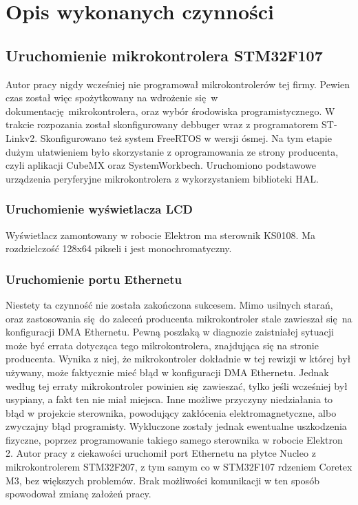 \documentclass[10pt,a4paper]{article}
\begin{document}
	\section{Opis wykonanych czynności}
	\subsection{Uruchomienie mikrokontrolera STM32F107}
	Autor pracy nigdy wcześniej nie programował mikrokontrolerów tej firmy. Pewien czas został więc spożytkowany na wdrożenie się w dokumentację mikrokontrolera, oraz wybór środowiska programistycznego. W trakcie rozpozania został skonfigurowany debbuger wraz z programatorem ST-Linkv2. Skonfigurowano też system FreeRTOS w wersji ósmej. Na tym etapie dużym ułatwieniem było skorzystanie z oprogramowania ze strony producenta, czyli aplikacji CubeMX oraz SystemWorkbech. Uruchomiono podstawowe urządzenia peryferyjne mikrokontrolera z wykorzystaniem biblioteki HAL.
	\subsubsection{Uruchomienie wyświetlacza LCD}
	Wyświetlacz zamontowany w robocie Elektron ma sterownik KS0108. Ma rozdzielczość 128x64 pikseli i jest monochromatyczny.
	\subsubsection{Uruchomienie portu Ethernetu}
	Niestety ta czynność nie została zakończona sukcesem. Mimo usilnych starań, oraz zastosowania się do zaleceń producenta mikrokontroler stale zawieszał się na konfiguracji DMA Ethernetu. Pewną poszlaką w diagnozie zaistniałej sytuacji może być errata dotycząca tego mikrokontrolera, znajdująca się na stronie producenta. Wynika z niej, że mikrokontroler dokładnie w tej rewizji w której był używany, może faktycznie mieć błąd w konfiguracji DMA Ethernetu. Jednak według tej erraty mikrokontroler powinien się zawieszać, tylko jeśli wcześniej był usypiany, a fakt ten nie miał miejsca. Inne możliwe przyczyny niedziałania to błąd w projekcie sterownika, powodujący zakłócenia elektromagnetyczne, albo zwyczajny błąd programisty. Wykluczone zostały jednak ewentualne uszkodzenia fizyczne, poprzez programowanie takiego samego sterownika w robocie Elektron 2. Autor pracy z ciekawości uruchomił port Ethernetu na płytce Nucleo z mikrokontrolerem STM32F207, z tym samym co w STM32F107 rdzeniem Coretex M3, bez większych problemów. Brak możliwości komunikacji w ten sposób spowodował zmianę założeń pracy.
\end{document}
